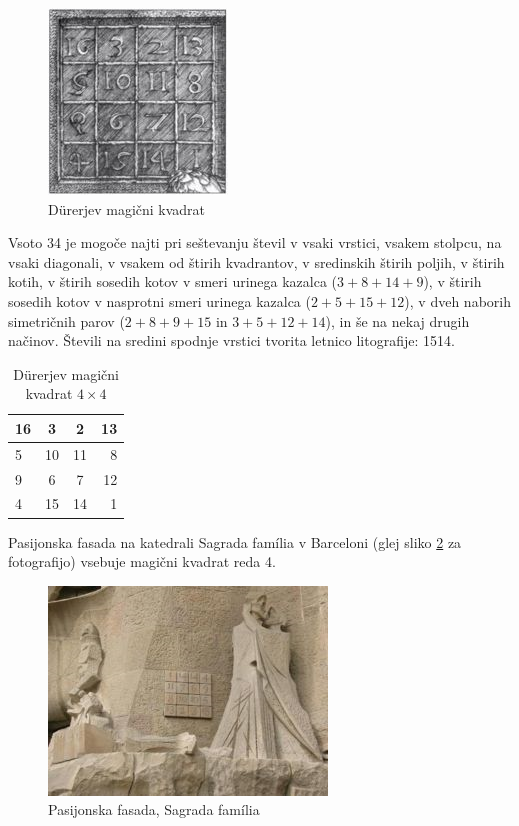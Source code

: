 \documentclass[a4paper,12pt]{article}
\begin{document}
\begin{figure}
   \centering
   \includegraphics[scale=1.5]{durer.png}
   \caption{Dürerjev magični kvadrat}
   \label{fig:durer}
\end{figure}


Vsoto 34 je mogoče najti pri seštevanju števil v vsaki vrstici, vsakem stolpcu,
na vsaki diagonali, v vsakem od štirih kvadrantov, v sredinskih štirih poljih,
v štirih kotih, v štirih sosedih kotov v smeri urinega kazalca ($3+8+14+9$), v
štirih sosedih kotov v nasprotni smeri urinega kazalca ($2+5+15+12$), v dveh naborih
simetričnih parov ($2+8+9+15$ in $3+5+12+14$), in še na nekaj drugih načinov.
Števili na sredini spodnje vrstici tvorita letnico litografije: 1514.

\begin {table}[h!]
   \begin{center}
      \caption{Dürerjev magični kvadrat $4\times 4$}
      \label{table:durer}
      \begin{tabular}{l | c | c | r}
         16 & 3 & 2 & 13 \\\hline
         5 & 10 & 11 & 8 \\\hline
         9 & 6 & 7 & 12 \\\hline
         4 & 15 & 14 & 1 \\\hline
      \end{tabular}
   \end{center}
\end{table}

Pasijonska fasada na katedrali Sagrada família v Barceloni
(glej sliko \ref{fig:sagrada} za fotografijo) vsebuje magični kvadrat reda 4.

\begin{figure}
   \centering
   \includegraphics[scale=1.3]{sagrada.png}
   \caption{Pasijonska fasada, Sagrada família}
   \label{fig:sagrada}
\end{figure}
\end{document}
